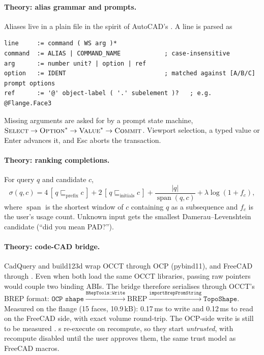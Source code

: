 \paragraph{Theory: alias grammar and prompts.} Aliases live in a plain file in the spirit of AutoCAD's
. A line is parsed as
\begin{lstlisting}
line     := command ( WS arg )*
command  := ALIAS | COMMAND_NAME            ; case-insensitive
arg      := number unit? | option | ref
option   := IDENT                           ; matched against [A/B/C] prompt options
ref      := '@' object-label ( '.' subelement )?   ; e.g. @Flange.Face3
\end{lstlisting}
Missing arguments are asked for by a prompt state machine,
$\textsc{Select}\to\textsc{Option}^{*}\to\textsc{Value}^{*}\to\textsc{Commit}$. Viewport selection, a typed value or
Enter advances it, and Esc aborts the transaction.

\paragraph{Theory: ranking completions.} For query $q$ and candidate $c$,
\[
  \sigma(q,c) = 4\,[\,q \sqsubseteq_{\text{prefix}} c\,] + 2\,[\,q \sqsubseteq_{\text{initials}} c\,]
  + \frac{|q|}{\operatorname{span}(q,c)} + \lambda\log(1+f_c),
\]
where $\operatorname{span}$ is the shortest window of $c$ containing $q$ as a subsequence and $f_c$ is the
user's usage count. Unknown input gets the smallest Damerau--Levenshtein candidate (``did you mean PAD?'').

\paragraph{Theory: code-CAD bridge.} CadQuery and build123d wrap OCCT through OCP (pybind11), and FreeCAD
through . Even when both load the same OCCT libraries, passing raw 
pointers would couple two binding ABIs. The bridge therefore serialises through OCCT's BREP format:
$\texttt{OCP shape}\xrightarrow{\texttt{BRepTools::Write}}\text{BREP}\xrightarrow{\texttt{importBrepFromString}}\texttt{TopoShape}$.
Measured on the flange (15 faces, 10.9\,kB): 0.17\,ms to write and 0.12\,ms to read on the FreeCAD side,
with exact volume round-trip. The OCP-side write is still to be measured \verify.
s re-execute on recompute, so they start \emph{untrusted}, with recompute disabled until
the user approves them, the same trust model as FreeCAD macros.


